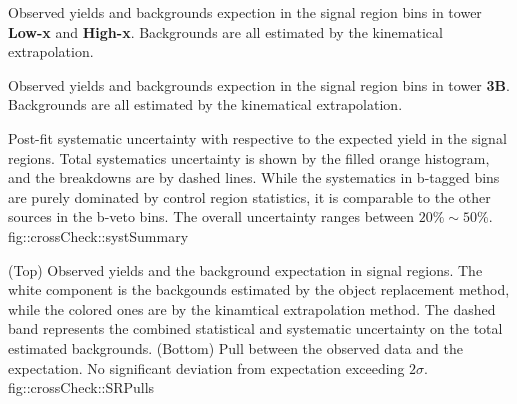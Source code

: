 \begin{table}[h]
  \begin{center}
    \caption{
        Observed yields and backgrounds expection in the signal region bins in tower \textbf{Low-x} and \textbf{High-x}.
        Backgrounds are all estimated by the kinematical extrapolation. 
    \label{tab::crossCheck::yieldsSRs_Lowx_Highx}}
    
    
  \end{center}
\end{table}

\begin{table}[h]
  \begin{center}
    \caption{
        Observed yields and backgrounds expection in the signal region bins in tower \textbf{3B}.
        Backgrounds are all estimated by the kinematical extrapolation. 
    \label{tab::crossCheck::yieldsSRs_3B}}
    
  \end{center}
\end{table}

\clearpage
{
    Post-fit systematic uncertainty with respective to the expected yield in the signal regions. 
    Total systematics uncertainty is shown by the filled orange histogram, and the breakdowns are by dashed lines.
    While the systematics in b-tagged bins are purely dominated by control region statistics, 
    it is comparable to the other sources in the b-veto bins. The overall uncertainty ranges between $20\%\sim50\%$.
}       
{fig::crossCheck::systSummary}
    
{
    (Top) Observed yields and the background expectation in signal regions. The white component is the backgounds estimated by the object replacement method, while the colored ones are by the kinamtical extrapolation method. The dashed band represents the combined statistical and systematic uncertainty on the total estimated backgrounds.
    (Bottom) Pull between the observed data and the expectation. No significant deviation from expectation exceeding $2\sigma$.
}
{fig::crossCheck::SRPulls}





